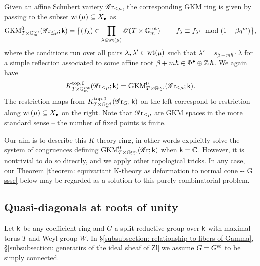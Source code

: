 \begin{remark}
Given an affine Schubert variety $\Gr_{\leq \mu}$, the corresponding GKM ring is given by passing to the subset $\wt(\mu) \subseteq X_{\bullet}$ as
\begin{equation*}
    \GKM^{0}_{T \times \Gm^{\rot}}(\Gr_{\leq \mu}; \k) 
    = \bigl\{ (f_{\lambda}) \in \prod_{\lambda \in \wt(\mu)} \O(T \times \Gm^{\rot}) \quad \big| \quad f_{\lambda} \equiv f_{\lambda'} \mod (1 - {\beta}q^m) \bigr\},
\end{equation*}
where the conditions run over all pairs $\lambda, \lambda' \in \wt(\mu)$ such that $\lambda' = s_{\beta + m\hbar} \cdot \lambda$ for a simple reflection associated to some affine root $\beta + m\hbar \in \Phi^{\bullet} \oplus \Z \hbar$. We again have
\begin{equation*}
K^{\top, 0}_{T \times \Gm^{\rot}}(\Gr_{\leq \mu}; \k) = \GKM^{0}_{T \times \Gm^{\rot}}(\Gr_{\leq \mu}; \k). 
\end{equation*}
The restriction maps from $K^{\top, 0}_{T \times \Gm^{\rot}}(\Gr_G; \k)$ on the left correspond to restriction along $\wt(\mu) \subseteq X_{\bullet}$ on the right. Note that $\Gr_{\leq \mu}$ are GKM spaces in the more standard sense -- the number of fixed points is finite.
\end{remark}


Our aim is to describe this $K$-theory ring, in other words explicitly solve the system of congruences defining $\GKM^0_{T \times \Gm^{\rot}}(\Gr; \k)$ when $\k=\C$. However, it is nontrivial to do so directly, and we apply other topological tricks. In any case, our Theorem \ref{theorem: equivariant K-theory as deformation to normal cone -- G sssc} below may be regarded as a solution to this purely combinatorial problem. 







\subsection{Quasi-diagonals at roots of unity}\label{section: quasi-diagonals at roots of unity}
Let $\k$ be any coefficient ring and $G$ a split reductive group over $\k$ with maximal torus $T$ and Weyl group $W$.
In \S \ref{subsubsection: relationship to fibers of Gamma}, \S \ref{subsubsection: generatirs of the ideal sheaf of Zl} we assume $G=G^{\sc}$ to be simply connected. 

